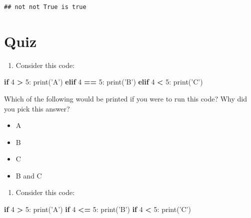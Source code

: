 \documentclass[]{book}
\newenvironment{Shaded}{\begin{snugshade}}{\end{snugshade}}
\newcommand{\BuiltInTok}[1]{#1}
\newcommand{\ControlFlowTok}[1]{\textcolor[rgb]{0.13,0.29,0.53}{\textbf{#1}}}
\newcommand{\DecValTok}[1]{\textcolor[rgb]{0.00,0.00,0.81}{#1}}
\newcommand{\NormalTok}[1]{#1}
\newcommand{\OperatorTok}[1]{\textcolor[rgb]{0.81,0.36,0.00}{\textbf{#1}}}
\newcommand{\StringTok}[1]{\textcolor[rgb]{0.31,0.60,0.02}{#1}}
\providecommand{\tightlist}{%
  \setlength{\itemsep}{0pt}\setlength{\parskip}{0pt}}
\theoremstyle{definition}
\theoremstyle{definition}
\theoremstyle{definition}
\theoremstyle{remark}
\begin{document}
\begin{verbatim}
## not not True is true
\end{verbatim}

\hypertarget{quiz-2}{%
\section{Quiz}\label{quiz-2}}

\begin{enumerate}
\def\labelenumi{\arabic{enumi}.}
\tightlist
\item
  Consider this code:
\end{enumerate}

\begin{Shaded}
\begin{Highlighting}[]
\ControlFlowTok{if} \DecValTok{4} \OperatorTok{>} \DecValTok{5}\NormalTok{:}
    \BuiltInTok{print}\NormalTok{(}\StringTok{'A'}\NormalTok{)}
\ControlFlowTok{elif} \DecValTok{4} \OperatorTok{==} \DecValTok{5}\NormalTok{:}
    \BuiltInTok{print}\NormalTok{(}\StringTok{'B'}\NormalTok{)}
\ControlFlowTok{elif} \DecValTok{4} \OperatorTok{<} \DecValTok{5}\NormalTok{:}
    \BuiltInTok{print}\NormalTok{(}\StringTok{'C'}\NormalTok{)}
\end{Highlighting}
\end{Shaded}

Which of the following would be printed if you were to run this code?
Why did you pick this answer?

\begin{itemize}
\tightlist
\item
  A
\item
  B
\item
  C
\item
  B and C
\end{itemize}

\begin{enumerate}
\def\labelenumi{\arabic{enumi}.}
\setcounter{enumi}{1}
\tightlist
\item
  Consider this code:
\end{enumerate}

\begin{Shaded}
\begin{Highlighting}[]
\ControlFlowTok{if} \DecValTok{4} \OperatorTok{>} \DecValTok{5}\NormalTok{:}
    \BuiltInTok{print}\NormalTok{(}\StringTok{'A'}\NormalTok{)}
\ControlFlowTok{if} \DecValTok{4} \OperatorTok{<=} \DecValTok{5}\NormalTok{:}
    \BuiltInTok{print}\NormalTok{(}\StringTok{'B'}\NormalTok{)}
\ControlFlowTok{if} \DecValTok{4} \OperatorTok{<} \DecValTok{5}\NormalTok{:}
    \BuiltInTok{print}\NormalTok{(}\StringTok{'C'}\NormalTok{)}
\end{Highlighting}
\end{Shaded}
\end{document}
